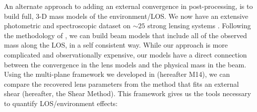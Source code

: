 An alternate approach to adding an external convergence in post-processing, is to build full, 3-D mass models of the environment/LOS.  We now have an extensive photometric and spectroscopic dataset on $\sim25$ strong lensing systems \citep{Momcheva06,Williams08,Wong11,Momcheva15}. Following the methodology of \citet{Wong11}, we can build beam models that include all of the observed mass along the LOS, in a self consistent way.  While our approach is more complicated and observationally expensive, our models have a direct connection between the convergence in the lens models and the physical mass in the beam. Using the multi-plane framework we developed in \citet{McCully14} (hereafter M14), we can compare the recovered lens parameters from the method that fits an external shear (hereafter, the Shear Method). This framework gives us the tools necessary to quantify LOS/environment effects:
